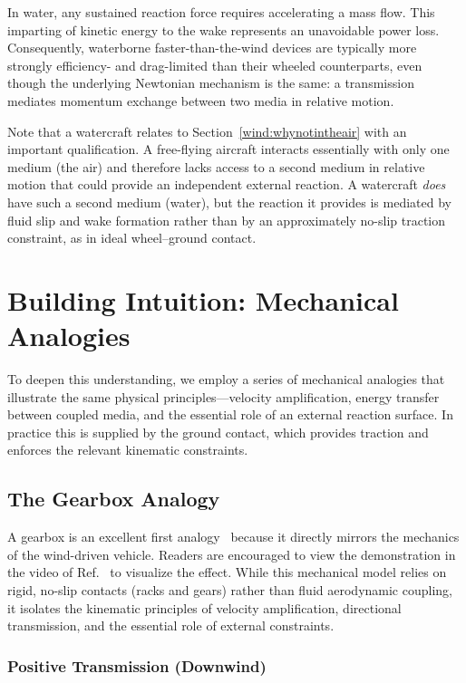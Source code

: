 \documentclass[reprint,aps,pra,longbibliography]{revtex4-2}
\begin{document}
In water, any sustained reaction force requires accelerating a mass flow. This
imparting of kinetic energy to the wake represents an unavoidable power loss.
Consequently, waterborne faster-than-the-wind devices are
typically more strongly efficiency- and drag-limited than their wheeled
counterparts, even though the underlying Newtonian mechanism is the same: a
transmission mediates momentum exchange between two media in relative motion.

Note that a watercraft relates to Section~\ref{wind:whynotintheair} with an important
qualification. A free-flying aircraft interacts essentially with only one medium
(the air) and therefore lacks access to a second medium in relative motion that
could provide an independent external reaction. A watercraft \emph{does} have such
a second medium (water), but the reaction it provides is mediated by fluid slip and
wake formation rather than by an approximately no-slip traction constraint, as in
ideal wheel--ground contact.

\section{Building Intuition: Mechanical Analogies}

To deepen this understanding, we employ a series of mechanical analogies that illustrate the same physical principles---velocity amplification, energy transfer between coupled media, and the essential role of an external reaction surface. In practice this is supplied by the ground contact, which provides traction and enforces the relevant kinematic constraints.


\subsection{The Gearbox Analogy}

A gearbox is an excellent first analogy~\cite{veritasium_2021_physics} because it directly mirrors the mechanics of the wind-driven vehicle.
Readers are encouraged to view the demonstration in the video of Ref.~\cite{veritasium_2021_physics} to visualize the effect.
While this mechanical model relies on rigid, no-slip contacts (racks and gears) rather than fluid aerodynamic coupling, it isolates the kinematic principles of velocity amplification, directional transmission, and the essential role of external constraints.

\subsubsection{Positive Transmission (Downwind)}
\end{document}
